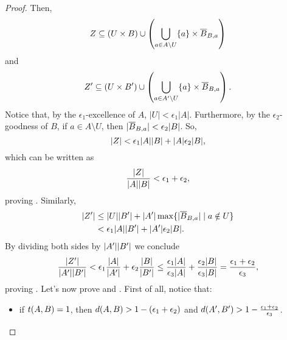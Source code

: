 \begin{lemma}
\begin{proof}
                Then,
                \[
                    Z \subseteq (U \times B) \cup \left( \bigcup_{a \in A \setminus U} \{ a \} \times \overline{B}_{B,a} \right)
                \]
                and
                \[
                    Z' \subseteq (U \times B') \cup \left( \bigcup_{a \in A' \setminus U} \{ a \} \times \overline{B}_{B,a} \right).
                \]
                Notice that, by the $\epsilon_1$-excellence of $A$, $|U| < \epsilon_1 |A|$.
                Furthermore, by the $\epsilon_2$-goodness of $B$,
                if $a \in A \setminus U$, then $| \overline{B}_{B,a} | < \epsilon_2 | B |$.
                So,
                \[
                    | Z | < \epsilon_1 | A | | B | + | A | \epsilon_2 | B |,
                \]
                which can be written as
                \[
                        \frac{| Z |}{| A | | B |} < \epsilon_1 + \epsilon_2,
                \]
                proving .
                Similarly,
                \begin{align*}
                    | Z' | & \leq | U | | B' | + | A' | \max \{ | \overline{B}_{B,a} | \mid a \notin U \} \\
                                     & < \epsilon_1 | A | | B' | + | A' | \epsilon_2 | B |.
                \end{align*}
                By dividing both sides by $| A' | | B' |$ we conclude
                \[
                    \frac{| Z' |}{| A' | | B' |} < \epsilon_1 \frac{| A |}{| A' |} + \epsilon_2 \frac{| B |}{| B' |}
                    \leq \frac{\epsilon_1 | A |}{\epsilon_3 | A |} + \frac{\epsilon_2 | B |} {\epsilon_3 | B |}
                    = \frac{\epsilon_1 + \epsilon_2}{\epsilon_3},
                \]
                proving .
                Let's now prove  and .
                First of all, notice that:
                \begin{itemize}
                    \item if $t( A,B ) = 1$, then $d( A,B ) > 1 - ( \epsilon_1 + \epsilon_2 )$
                        and $d ( A',B' ) > 1 - \frac{\epsilon_1 + \epsilon_2}{\epsilon_3}$.

\end{itemize}
\end{proof}
\end{lemma}
